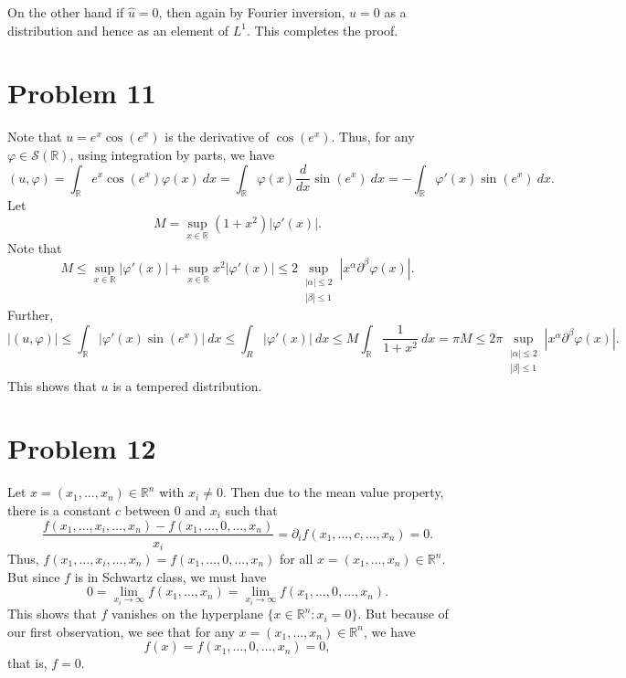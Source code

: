 \documentclass[10pt]{amsart}
\theoremstyle{thmstyle}
\theoremstyle{defstyle}
\newcommand{\R}{\mathbb{R}}
\newcommand{\scrS}{\mathscr S}
\newcommand{\wh}[1]{\widehat{#1}}
\renewcommand{\le}{\leqslant}
\begin{document}
On the other hand if $\wh u = 0$, then again by Fourier inversion, $u = 0$ as a distribution and hence as an element of $L^1$. This completes the proof.

\section{Problem 11}
Note that $u = e^x\cos(e^x)$ is the derivative of $\cos(e^x)$. Thus, for any $\varphi\in\scrS(\R)$, using integration by parts, we have 
\begin{equation*}
    (u,\varphi) = \int_{\R} e^x\cos (e^x)\varphi(x)~dx = \int_{\R}\varphi(x)\frac{d}{dx}\sin(e^x)~dx = - \int_{\R} \varphi'(x)\sin(e^x)~dx.
\end{equation*}
Let 
\begin{equation*}
    M = \sup_{x\in\R}(1 + x^2)|\varphi'(x)|.
\end{equation*}
Note that 
\begin{equation*}
    M\le \sup_{x\in\R} |\varphi'(x)| + \sup_{x\in\R} x^2|\varphi'(x)|\le 2\sup_{\substack{|\alpha|\le 2\\|\beta|\le 1}} |x^\alpha\partial^\beta\varphi(x)|.
\end{equation*}
Further, 
\begin{equation*}
    |(u,\varphi)|\le\int_{\R} |\varphi'(x)\sin(e^x)|~dx\le\int_R|\varphi'(x)|~dx\le M\int_{\R}\frac{1}{1 + x^2}~dx = \pi M\le 2\pi\sup_{\substack{|\alpha|\le 2\\|\beta|\le 1}} |x^\alpha\partial^\beta\varphi(x)|.
\end{equation*}
This shows that $u$ is a tempered distribution.

\section{Problem 12}

Let $x = (x_1,\dots,x_n)\in\R^n$ with $x_i\ne 0$. Then due to the mean value property, there is a constant $c$ between $0$ and $x_i$ such that 
\begin{equation*}
    \frac{f(x_1,\dots,x_i, \dots, x_n) - f(x_1,\dots, 0,\dots, x_n)}{x_i} = \partial_i f(x_1,\dots,c,\dots,x_n) = 0.
\end{equation*}
Thus, $f(x_1,\dots,x_i,\dots,x_n) = f(x_1,\dots,0,\dots,x_n)$ for all $x = (x_1,\dots,x_n)\in\R^n$. But since $f$ is in Schwartz class, we must have 
\begin{equation*}
    0 = \lim_{x_i\to\infty} f(x_1,\dots,x_n) = \lim_{x_i\to\infty}f(x_1,\dots,0,\dots,x_n).
\end{equation*}
This shows that $f$ vanishes on the hyperplane $\{x\in\R^n\colon  x_i = 0\}$. But because of our first observation, we see that for any $x = (x_1,\dots,x_n)\in\R^n$, we have 
\begin{equation*}
    f(x) = f(x_1,\dots,0,\dots, x_n) = 0,
\end{equation*}
that is, $f = 0$.
\end{document}

